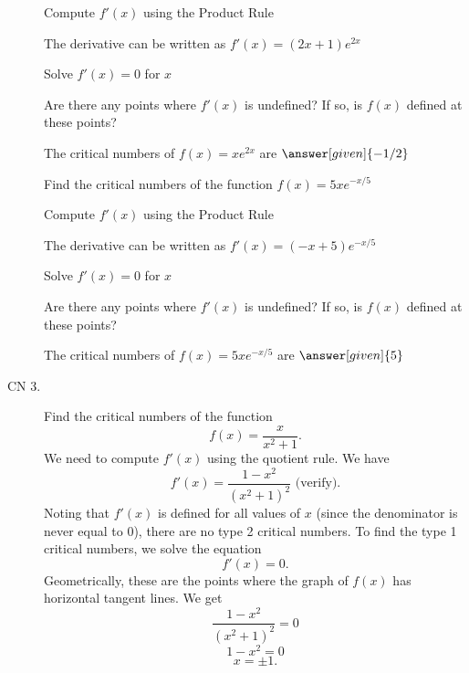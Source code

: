 \documentclass{ximera}
\begin{document}
\begin{description}
\begin{question}
  
    \begin{hint}
      Compute $f'(x)$ using the Product Rule
    \end{hint}
    \begin{hint}
      The derivative can be written as $f'(x) = (2x + 1)e^{2x}$
    \end{hint}
		\begin{hint}
      Solve $f'(x) = 0$ for $x$
    \end{hint}
    \begin{hint}
      Are there any points where $f'(x)$ is undefined?
      If so, is $f(x)$ defined at these points?  
		\end{hint}
    
    
		The critical numbers of $f(x) = xe^{2x}$ are
		 $\answer[given]{-1/2}$
		
\end{question}


\begin{question} %
  Find the critical numbers of the function $f(x) = 5xe^{-x/5}$
  
  
    \begin{hint}
      Compute $f'(x)$ using the Product Rule
    \end{hint}
    \begin{hint}
      The derivative can be written as $f'(x) = (-x + 5)e^{-x/5}$
    \end{hint}
		\begin{hint}
      Solve $f'(x) = 0$ for $x$
    \end{hint}
    \begin{hint}
      Are there any points where $f'(x)$ is undefined?
      If so, is $f(x)$ defined at these points?  
		\end{hint}
    
    
		The critical numbers of $f(x) = 5xe^{-x/5}$ are
		 $\answer[given]{5}$
		
\end{question}




\item[CN 3.] Find the critical numbers of the function 
\[f(x) = \dfrac{x}{x^2 +1}.\]
We need to compute $f'(x)$ using the quotient rule.  We have
\[f'(x) = \frac{1-x^2}{(x^2+1)^2} \mbox{   (verify)}.\]
Noting that $f'(x)$ is defined for all values of $x$ (since the denominator is never equal to 0), 
there are no type 2 critical numbers.
To find the type 1 critical numbers, we solve the equation
\[f'(x) = 0.\]
Geometrically, these are the points where the graph of $f(x)$ has horizontal tangent lines.
We get
\[ \frac{1-x^2}{(x^2+1)^2} =0\]
\[ 1-x^2 =0\]
\[x = \pm 1.\]


\end{description}
\end{document}
